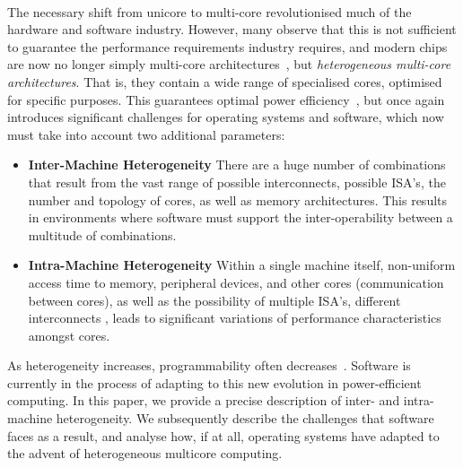 \paragraph{} The necessary shift from unicore to multi-core revolutionised
much of the hardware and software industry. However, many observe
that this is not sufficient to guarantee the performance requirements
industry requires, and modern chips are now no longer simply multi-core
architectures~\cite{borkar2011future}, but \emph{heterogeneous multi-core architectures}. 
That is, they contain a wide range of specialised cores, optimised for specific
purposes. This guarantees optimal power efficiency~\cite{5695539}, but once again introduces significant
challenges for operating systems and software, which now must take into account
two additional parameters: 
\begin{itemize}
\item \textbf{Inter-Machine Heterogeneity} There are a huge number of combinations that result from the vast range of possible interconnects, possible ISA's, the number and topology of cores, as well as memory architectures. This results in environments where software must support the inter-operability between a multitude of combinations.
\item \textbf{Intra-Machine Heterogeneity} Within a single machine itself, non-uniform access time to memory, peripheral devices, and other cores (\ie communication between cores), as well as the possibility of multiple ISA's, different interconnects \etc, leads to significant variations of performance characteristics amongst cores.
\end{itemize}
As heterogeneity increases, programmability often decreases~\cite{kahle2005cell}. 
Software is currently in the process of adapting to this
new evolution in power-efficient computing.  In this paper, we provide a precise 
description of inter- and intra- machine heterogeneity. We subsequently 
describe the challenges that software faces as a result, and analyse how, if at all,
 operating systems have adapted to the advent of heterogeneous multicore computing. 



